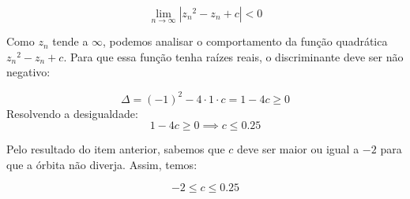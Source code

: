 \begin{enumerate}[label=(\alph*)]
        \[
        \lim_{n \to \infty} \left| {z_n}^2  -z_n + c \right| < 0
        \]

        Como \( z_n \) tende a \( \infty \), podemos analisar o comportamento da função quadrática \( {z_n}^2 - z_n + c \). Para que essa função tenha raízes reais, o discriminante deve ser não negativo:

        \[
        \Delta = (-1)^2 - 4 \cdot 1 \cdot
        c = 1 - 4c \geq 0
        \]
        Resolvendo a desigualdade:
        \[
        1 - 4c \geq 0 \implies c \leq 0.25
        \]


        Pelo resultado do item anterior, sabemos que \( c \) deve ser maior ou igual a \( -2 \) para que a órbita não diverja. Assim, temos:

        \[
        -2 \leq c \leq 0.25
        \]



\end{enumerate}